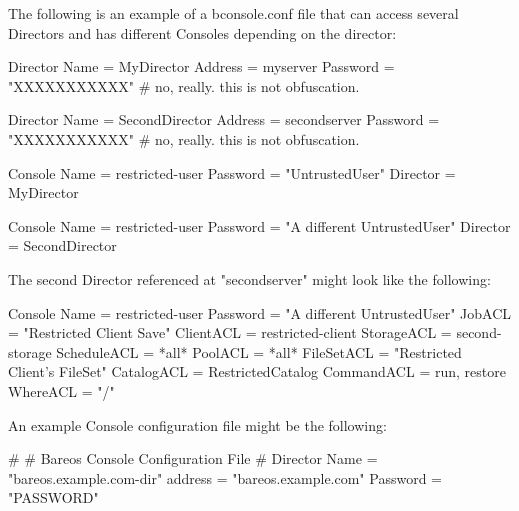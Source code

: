The following is an example of a bconsole.conf file that can access
several Directors and has different Consoles depending on the director:

\begin{bconfig}{}
Director {
   Name = MyDirector
   Address = myserver
   Password = "XXXXXXXXXXX"    # no, really.  this is not obfuscation.
}

Director {
   Name = SecondDirector
   Address = secondserver
   Password = "XXXXXXXXXXX"    # no, really.  this is not obfuscation.
}

Console {
   Name = restricted-user
   Password = "UntrustedUser"
   Director = MyDirector
}

Console {
   Name = restricted-user
   Password = "A different UntrustedUser"
   Director = SecondDirector
}
\end{bconfig}

The second Director referenced at "secondserver" might look
like the following:

\begin{bconfig}{}
Console {
  Name = restricted-user
  Password = "A different UntrustedUser"
  JobACL = "Restricted Client Save"
  ClientACL = restricted-client
  StorageACL = second-storage
  ScheduleACL = *all*
  PoolACL = *all*
  FileSetACL = "Restricted Client's FileSet"
  CatalogACL = RestrictedCatalog
  CommandACL = run, restore
  WhereACL = "/"
}
\end{bconfig}


An example Console configuration file might be the following:

\begin{bconfig}{}
#
# Bareos Console Configuration File
#
Director {
  Name = "bareos.example.com-dir"
  address = "bareos.example.com"
  Password = "PASSWORD"
}
\end{bconfig}
